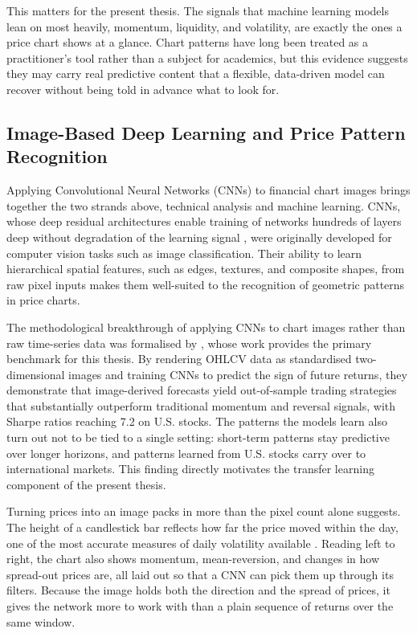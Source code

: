 This matters for the present thesis. The signals that machine learning models lean on most heavily, momentum, liquidity, and volatility, are exactly the ones a price chart shows at a glance. Chart patterns have long been treated as a practitioner's tool rather than a subject for academics, but this evidence suggests they may carry real predictive content that a flexible, data-driven model can recover without being told in advance what to look for.

\subsection{Image-Based Deep Learning and Price Pattern Recognition}

Applying Convolutional Neural Networks (CNNs) to financial chart images brings together the two strands above, technical analysis and machine learning. CNNs, whose deep residual architectures enable training of networks hundreds of layers deep without degradation of the learning signal \parencite{he2016}, were originally developed for computer vision tasks such as image classification. Their ability to learn hierarchical spatial features, such as edges, textures, and composite shapes, from raw pixel inputs makes them well-suited to the recognition of geometric patterns in price charts.

The methodological breakthrough of applying CNNs to chart images rather than raw time-series data was formalised by \textcite{Jiang2023}, whose work provides the primary benchmark for this thesis. By rendering OHLCV data as standardised two-dimensional images and training CNNs to predict the sign of future returns, they demonstrate that image-derived forecasts yield out-of-sample trading strategies that substantially outperform traditional momentum and reversal signals, with Sharpe ratios reaching 7.2 on U.S. stocks. The patterns the models learn also turn out not to be tied to a single setting: short-term patterns stay predictive over longer horizons, and patterns learned from U.S. stocks carry over to international markets. This finding directly motivates the transfer learning component of the present thesis.

Turning prices into an image packs in more than the pixel count alone suggests. The height of a candlestick bar reflects how far the price moved within the day, one of the most accurate measures of daily volatility available \parencite{Andersen1998}. Reading left to right, the chart also shows momentum, mean-reversion, and changes in how spread-out prices are, all laid out so that a CNN can pick them up through its filters. Because the image holds both the direction and the spread of prices, it gives the network more to work with than a plain sequence of returns over the same window.

